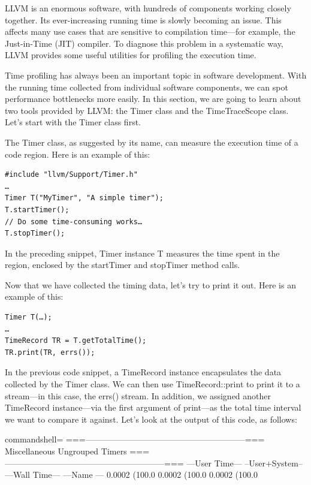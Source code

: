 
LLVM is an enormous software, with hundreds of components working closely together. Its ever-increasing running time is slowly becoming an issue. This affects many use cases that are sensitive to compilation time—for example, the Just-in-Time (JIT) compiler. To diagnose this problem in a systematic way, LLVM provides some useful utilities for profiling the execution time.

Time profiling has always been an important topic in software development. With the running time collected from individual software components, we can spot performance bottlenecks more easily. In this section, we are going to learn about two tools provided by LLVM: the Timer class and the TimeTraceScope class. Let's start with the Timer class first.


The Timer class, as suggested by its name, can measure the execution time of a code region. Here is an example of this:

\begin{lstlisting}[style=styleCXX]
#include "llvm/Support/Timer.h"
…
Timer T("MyTimer", "A simple timer");
T.startTimer();
// Do some time-consuming works…
T.stopTimer();
\end{lstlisting}

In the preceding snippet, Timer instance T measures the time spent in the region, enclosed by the startTimer and stopTimer method calls. 

Now that we have collected the timing data, let's try to print it out. Here is an example of this:

\begin{lstlisting}[style=styleCXX]
Timer T(…);
…
TimeRecord TR = T.getTotalTime();
TR.print(TR, errs());
\end{lstlisting}

In the previous code snippet, a TimeRecord instance encapsulates the data collected by the Timer class. We can then use TimeRecord::print to print it to a stream—in this case, the errs() stream. In addition, we assigned another TimeRecord instance—via the first argument of print—as the total time interval we want to compare it against. Let's look at the output of this code, as follows:

\begin{tcblisting}{commandshell={}}
===---------------------------------------------------------===
                Miscellaneous Ungrouped Timers
===---------------------------------------------------------===
---User Time--- --User+System-- ---Wall Time--- ---Name ---
 0.0002 (100.0%
 0.0002 (100.0%
 0.0002 (100.0%
\end{tcblisting}

